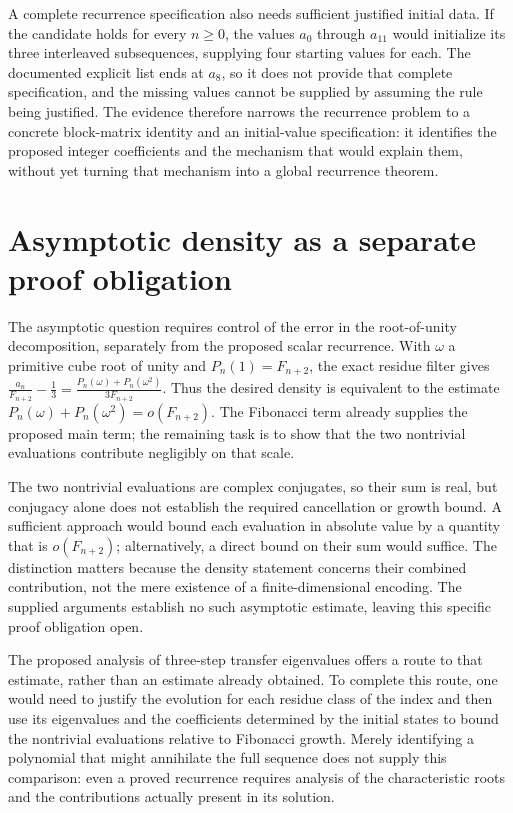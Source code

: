 \documentclass[11pt]{article}
\begin{document}
A complete recurrence specification also needs sufficient justified initial data. If the candidate holds for every $n\geq0$, the values $a_0$ through $a_{11}$ would initialize its three interleaved subsequences, supplying four starting values for each. The documented explicit list ends at $a_8$, so it does not provide that complete specification, and the missing values cannot be supplied by assuming the rule being justified. The evidence therefore narrows the recurrence problem to a concrete block-matrix identity and an initial-value specification: it identifies the proposed integer coefficients and the mechanism that would explain them, without yet turning that mechanism into a global recurrence theorem.

\section{Asymptotic density as a separate proof obligation}
The asymptotic question requires control of the error in the root-of-unity decomposition, separately from the proposed scalar recurrence. With $\omega$ a primitive cube root of unity and $P_n(1)=F_{n+2}$, the exact residue filter gives $\displaystyle \frac{a_n}{F_{n+2}}-\frac13=\frac{P_n(\omega)+P_n(\omega^2)}{3F_{n+2}}$. Thus the desired density is equivalent to the estimate $P_n(\omega)+P_n(\omega^2)=o(F_{n+2})$. The Fibonacci term already supplies the proposed main term; the remaining task is to show that the two nontrivial evaluations contribute negligibly on that scale.

The two nontrivial evaluations are complex conjugates, so their sum is real, but conjugacy alone does not establish the required cancellation or growth bound. A sufficient approach would bound each evaluation in absolute value by a quantity that is $o(F_{n+2})$; alternatively, a direct bound on their sum would suffice. The distinction matters because the density statement concerns their combined contribution, not the mere existence of a finite-dimensional encoding. The supplied arguments establish no such asymptotic estimate, leaving this specific proof obligation open.

The proposed analysis of three-step transfer eigenvalues offers a route to that estimate, rather than an estimate already obtained. To complete this route, one would need to justify the evolution for each residue class of the index and then use its eigenvalues and the coefficients determined by the initial states to bound the nontrivial evaluations relative to Fibonacci growth. Merely identifying a polynomial that might annihilate the full sequence does not supply this comparison: even a proved recurrence requires analysis of the characteristic roots and the contributions actually present in its solution.
\end{document}
